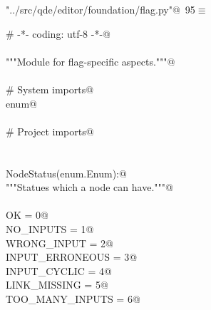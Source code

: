 \documentclass[
    a4paper,      %
    10pt,         %
    openright,    %
    notitlepage,  %
    parskip=half, %
]{scrreprt}       %
\theoremstyle{definition}                    %
\begin{document}
\begin{flushleft} \small
\begin{minipage}{\linewidth}\label{scrap157}\raggedright\small
{} \verb@"../src/qde/editor/foundation/flag.py"@\nobreak\ {\footnotesize {95}}$\equiv$
\vspace{-1ex}
\begin{list}{}{} \item
\mbox{}\lstinline@# -*- coding: utf-8 -*-@\\
\mbox{}\lstinline@@\\
\mbox{}\lstinline@"""Module for flag-specific aspects."""@\\
\mbox{}\lstinline@@\\
\mbox{}\lstinline@# System imports@\\
\mbox{}\lstinline@import enum@\\
\mbox{}\lstinline@@\\
\mbox{}\lstinline@# Project imports@\\
\mbox{}\lstinline@@\\
\mbox{}\lstinline@@\\
\mbox{}\lstinline@class NodeStatus(enum.Enum):@\\
\mbox{}\lstinline@    """Statues which a node can have."""@\\
\mbox{}\lstinline@@\\
\mbox{}\lstinline@    OK              = 0@\\
\mbox{}\lstinline@    NO_INPUTS       = 1@\\
\mbox{}\lstinline@    WRONG_INPUT     = 2@\\
\mbox{}\lstinline@    INPUT_ERRONEOUS = 3@\\
\mbox{}\lstinline@    INPUT_CYCLIC    = 4@\\
\mbox{}\lstinline@    LINK_MISSING    = 5@\\
\mbox{}\lstinline@    TOO_MANY_INPUTS = 6@\\
\mbox{}\lstinline@@{\NWsep}
\end{list}
\vspace{-1.5ex}
\footnotesize
\begin{list}{}{\setlength{\itemsep}{-\parsep}\setlength{\itemindent}{-\leftmargin}}

\item{}
\end{list}
\end{minipage}\vspace{4ex}
\end{flushleft}
\end{document}
